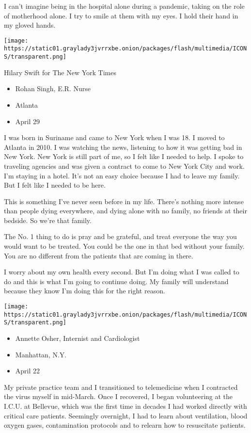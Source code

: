 I can't imagine being in the hospital alone during a pandemic, taking on
the role of motherhood alone. I try to smile at them with my eyes. I
hold their hand in my gloved hands.

\texttt{[image: https://static01.graylady3jvrrxbe.onion/packages/flash/multimedia/ICONS/transparent.png]}

Hilary Swift for The New York Times

\begin{itemize}
\tightlist
\item
  Rohan Singh, E.R. Nurse
\item
  Atlanta
\item
  April 29
\end{itemize}

I was born in Suriname and came to New York when I was 18. I moved to
Atlanta in 2010. I was watching the news, listening to how it was
getting bad in New York. New York is still part of me, so I felt like I
needed to help. I spoke to traveling agencies and was given a contract
to come to New York City and work. I'm staying in a hotel. It's not an
easy choice because I had to leave my family. But I felt like I needed
to be here.

This is something I've never seen before in my life. There's nothing
more intense than people dying everywhere, and dying alone with no
family, no friends at their bedside. So we're that family.

The No. 1 thing to do is pray and be grateful, and treat everyone the
way you would want to be treated. You could be the one in that bed
without your family. You are no different from the patients that are
coming in there.

I worry about my own health every second. But I'm doing what I was
called to do and this is what I'm going to continue doing. My family
will understand because they know I'm doing this for the right reason.

\texttt{[image: https://static01.graylady3jvrrxbe.onion/packages/flash/multimedia/ICONS/transparent.png]}

\begin{itemize}
\tightlist
\item
  Annette Osher, Internist and Cardiologist
\item
  Manhattan, N.Y.
\item
  April 22
\end{itemize}

My private practice team and I transitioned to telemedicine when I
contracted the virus myself in mid-March. Once I recovered, I began
volunteering at the I.C.U. at Bellevue, which was the first time in
decades I had worked directly with critical care patients. Seemingly
overnight, I had to learn about ventilation, blood oxygen gases,
contamination protocols and to relearn how to resuscitate patients.

